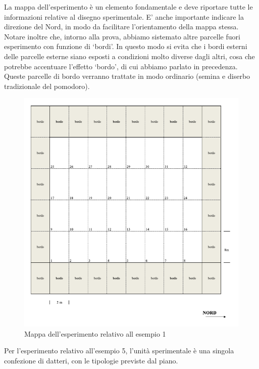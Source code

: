 \documentclass[a4paper,12pt,oneside]{book}
\theoremstyle{definition}
\theoremstyle{definition}
\theoremstyle{definition}
\theoremstyle{remark}
\begin{document}
La mappa dell'esperimento è un elemento fondamentale e deve riportare
tutte le informazioni relative al disegno sperimentale. E' anche
importante indicare la direzione del Nord, in modo da facilitare
l'orientamento della mappa stessa. Notare inoltre che, intorno alla
prova, abbiamo sistemato altre parcelle fuori esperimento con funzione
di `bordi'. In questo modo si evita che i bordi esterni delle parcelle
esterne siano esposti a condizioni molto diverse dagli altri, cosa che
potrebbe accentuare l'effetto `bordo', di cui abbiamo parlato in
precedenza. Queste parcelle di bordo verranno trattate in modo ordinario
(semina e diserbo tradizionale del pomodoro).

\begin{figure}

{\centering \includegraphics[width=0.9\linewidth]{_images/Mappa1} 

}

\caption{Mappa dell'esperimento relativo all esempio 1}\label{fig:figName31}
\end{figure}

Per l'esperimento relativo all'esempio 5, l'unità sperimentale è una
singola confezione di datteri, con le tipologie previste dal piano.
\end{document}

